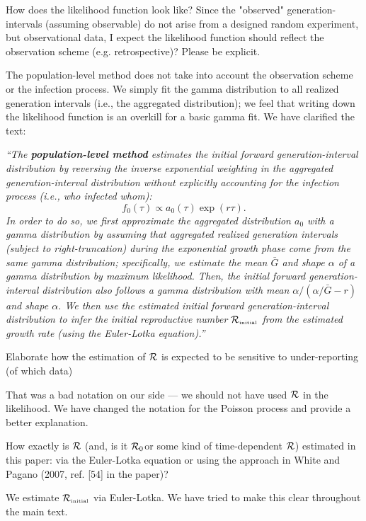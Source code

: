 \documentclass[12pt]{article}
\newcommand{\RR}{\ensuremath{{\cal R}}}
\newcommand{\Rx}[1]{\ensuremath{{\cal R}_{#1}}}
\newcommand{\Ro}{\Rx{0}}
\newcommand{\Rini}{\Rx{\textrm{\tiny initial}}}
\newcommand{\revtext}{\textsf}
\newcommand{\newtext}[1]{\textsl{``#1''}}
\begin{document}
\revtext{How does the likelihood
function look like? Since the "observed" generation-intervals (assuming
observable) do not arise from a designed random experiment, but observational data, I expect the likelihood function should reflect the observation
scheme (e.g. retrospective)? Please be explicit.
}

The population-level method does not take into account the observation scheme or the infection process. 
We simply fit the gamma distribution to all realized generation intervals (i.e., the aggregated distribution);
we feel that writing down the likelihood function is an overkill for a basic gamma fit.
We have clarified the text: 

\newtext{The \textbf{population-level method} estimates the initial forward generation-interval distribution by reversing the inverse exponential weighting in the aggregated generation-interval distribution without explicitly accounting for the infection process (i.e., who infected whom):
\begin{equation}
f_0(\tau) \propto a_0(\tau) \exp(r\tau).
\end{equation}
In order to do so, we first approximate the aggregated distribution $a_0$ with a gamma distribution by assuming that aggregated realized generation intervals (subject to right-truncation) during the exponential growth phase come from the same gamma distribution;
specifically, we estimate the mean $\bar G$ and shape $\alpha$ of a gamma distribution by maximum likelihood.
Then, the initial forward generation-interval distribution also follows a gamma distribution with mean $\alpha/(\alpha/\bar G - r)$ and shape $\alpha$.
We then use the estimated initial forward generation-interval distribution to infer the initial reproductive number $\Rini$ from the estimated growth rate (using the Euler-Lotka equation).}

\revtext{
Elaborate how the estimation of $\RR$ is expected to be sensitive to under-reporting (of which data)
}

That was a bad notation on our side --- we should not have used $\RR$ in the likelihood. 
We have changed the notation for the Poisson process and provide a better explanation.


\revtext{
How exactly is $\RR$ (and, is it \Ro or some kind of time-dependent \RR) estimated in this paper: via the Euler-Lotka equation or using the approach in White and Pagano (2007, ref. [54] in the paper)?
}

We estimate $\Rini$ via Euler-Lotka. We have tried to make this clear throughout the main text.
\end{document}

